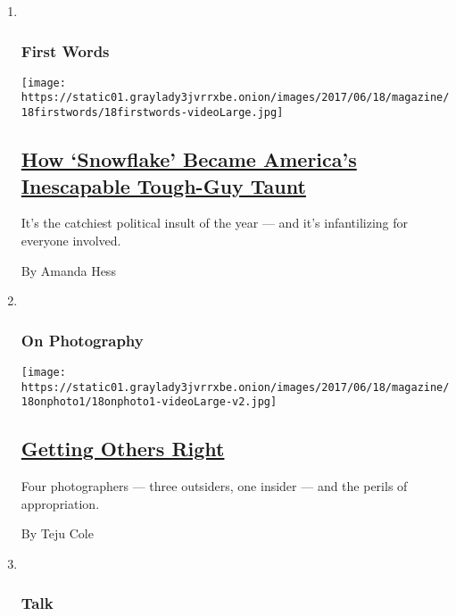 \begin{enumerate}
\def\labelenumi{\arabic{enumi}.}
\item ~
  \hypertarget{first-words}{%
  \subsubsection{First Words}\label{first-words}}

  \texttt{[image: https://static01.graylady3jvrrxbe.onion/images/2017/06/18/magazine/18firstwords/18firstwords-videoLarge.jpg]}

  \hypertarget{how-snowflake-became-americas-inescapable-tough-guy-taunt}{%
  \subsection{\texorpdfstring{\href{/2017/06/13/magazine/how-snowflake-became-americas-inescapable-tough-guy-taunt.html}{How
  `Snowflake' Became America's Inescapable Tough-Guy
  Taunt}}{How `Snowflake' Became America's Inescapable Tough-Guy Taunt}}\label{how-snowflake-became-americas-inescapable-tough-guy-taunt}}

  It's the catchiest political insult of the year --- and it's
  infantilizing for everyone involved.

  By Amanda Hess
\item ~
  \hypertarget{on-photography}{%
  \subsubsection{On Photography}\label{on-photography}}

  \texttt{[image: https://static01.graylady3jvrrxbe.onion/images/2017/06/18/magazine/18onphoto1/18onphoto1-videoLarge-v2.jpg]}

  \hypertarget{getting-others-right}{%
  \subsection{\texorpdfstring{\href{/2017/06/13/magazine/getting-others-right.html}{Getting
  Others Right}}{Getting Others Right}}\label{getting-others-right}}

  Four photographers --- three outsiders, one insider --- and the perils
  of appropriation.

  By Teju Cole
\item ~
  \hypertarget{talk}{%
  \subsubsection{Talk}\label{talk}}


\end{enumerate}
